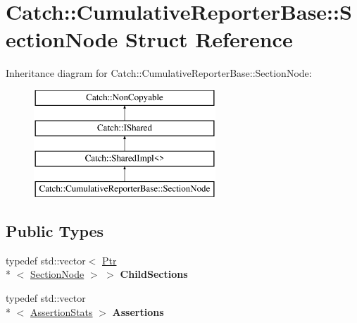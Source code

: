 \hypertarget{struct_catch_1_1_cumulative_reporter_base_1_1_section_node}{\section{Catch\-:\-:Cumulative\-Reporter\-Base\-:\-:Section\-Node Struct Reference}
\label{struct_catch_1_1_cumulative_reporter_base_1_1_section_node}
}
Inheritance diagram for Catch\-:\-:Cumulative\-Reporter\-Base\-:\-:Section\-Node\-:\begin{figure}[H]
\begin{center}
\leavevmode
\includegraphics[height=4.000000cm]{struct_catch_1_1_cumulative_reporter_base_1_1_section_node}
\end{center}
\end{figure}
\subsection*{Public Types}
\begin{DoxyCompactItemize}
\item 
\hypertarget{struct_catch_1_1_cumulative_reporter_base_1_1_section_node_adb1744ebcada97d26047ecbdc2d55dd6}{typedef std\-::vector$<$ \hyperlink{class_catch_1_1_ptr}{Ptr}\\*
$<$ \hyperlink{struct_catch_1_1_cumulative_reporter_base_1_1_section_node}{Section\-Node} $>$ $>$ {\bfseries Child\-Sections}}\label{struct_catch_1_1_cumulative_reporter_base_1_1_section_node_adb1744ebcada97d26047ecbdc2d55dd6}

\item 
\hypertarget{struct_catch_1_1_cumulative_reporter_base_1_1_section_node_a55613e2ef8a65bb1fc1f53504ffecb18}{typedef std\-::vector\\*
$<$ \hyperlink{struct_catch_1_1_assertion_stats}{Assertion\-Stats} $>$ {\bfseries Assertions}}\label{struct_catch_1_1_cumulative_reporter_base_1_1_section_node_a55613e2ef8a65bb1fc1f53504ffecb18}

\end{DoxyCompactItemize}
